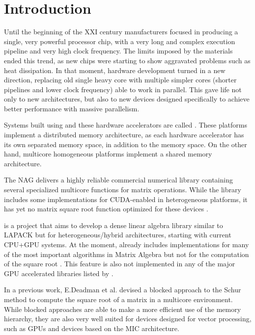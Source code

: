 \section{Introduction}
\label{sec:intro}

Until the beginning of the XXI century \cpu manufacturers focused in producing a single, very powerful processor chip, with a very long and complex execution pipeline and very high clock frequency. The limits imposed by the materials ended this trend, as new chips were starting to show aggravated problems such as heat dissipation. In that moment, hardware development turned in a new direction, replacing old single heavy core \cpus with multiple simpler cores (shorter pipelines and lower clock frequency) able to work in parallel. This gave life not only to new \cpu architectures, but also to new devices designed specifically to achieve better performance with massive parallelism.

Systems built using \cpus and these hardware accelerators are called \hetplats. These platforms implement a distributed memory architecture, as each hardware accelerator has its own separated memory space, in addition to the \cpu memory space. On the other hand, multicore homogeneous platforms implement a shared memory architecture.

The \acf{NAG}\cite{NAG} delivers a highly reliable commercial numerical library containing several specialized multicore functions for matrix operations. While the \nag library includes some implementations for CUDA-enabled \gpus in heterogeneous platforms, it has yet no matrix square root function optimized for these devices \cite{NAG:GPU:0:6}.

\magma is a project that aims to develop a dense linear algebra library similar to LAPACK but for heterogeneous/hybrid architectures, starting with current CPU+GPU systems. At the moment, \magma already includes implementations for many of the most important algorithms in Matrix Algebra but not for the computation of the square root \cite{PLASMA:MAGMA}. This feature is also not implemented in any of the major GPU accelerated libraries listed by \nvidia \cite{ACCELEREYES:WIKI:SQRTM,CULA:LAPACK,NVIDIA:CUBLAS:5:0,NVIDIA:CUSPARSE:5:0,CUSP:FEATURES}.

In a previous work, E.Deadman et al. \cite{Deadman:Higham:Ralha:2012} devised a blocked approach to the Schur method to compute the square root of a matrix in a multicore environment. While blocked approaches are able to make a more efficient use of the memory hierarchy, they are also very well suited for devices designed for vector processing, such as \acfp{GPU} and devices based on the \acf{MIC} architecture.

